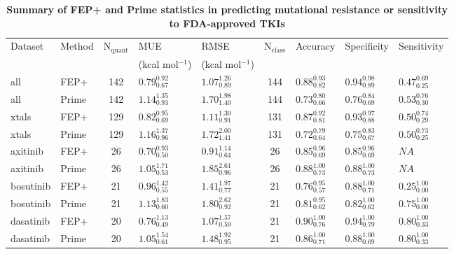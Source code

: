 \documentclass[phd,tocprelim]{cornell}
\begin{document}
\begin{landscape}
\begin{table}[p]
	\caption[Summary of FEP+ and Prime statistics in predicting mutational resistance or sensitivity to FDA-approved TKI]{
		\label{tab:abl-table-2} 
		{\bf Summary of FEP+ and Prime statistics in predicting mutational resistance or sensitivity to FDA-approved TKIs}
	}
	\setlength{\tabcolsep}{4pt}
	\begin{tabularx}{\linewidth}{X X | c X X | c X X X}
		\toprule
		Dataset		&Method		& N$_\mathrm{quant}$ &  MUE				   & RMSE					& N$_\mathrm{class}$ & Accuracy			& Specificity		& Sensitivity			\\
		&			&   &  (kcal mol$^{-1}$)		   & (kcal mol$^{-1}$)				& 	& 		 		& 					&		 			\\
		\midrule
		all & FEP+ & 142 & $0.79_{0.67}^{0.92}$ & $1.07_{0.89}^{1.26}$ & 144 & $0.88_{0.82}^{0.93}$ & $0.94_{0.89}^{0.98}$ & $0.47_{0.25}^{0.69}$ \\ 
		all & Prime & 142 & $1.14_{0.93}^{1.35}$ & $1.70_{1.40}^{1.98}$ & 144 & $0.73_{0.66}^{0.80}$ & $0.76_{0.69}^{0.84}$ & $0.53_{0.30}^{0.76}$ \\ 
		xtals & FEP+ & 129 & $0.82_{0.69}^{0.95}$ & $1.11_{0.91}^{1.30}$ & 131 & $0.87_{0.81}^{0.92}$ & $0.93_{0.88}^{0.97}$ & $0.50_{0.29}^{0.74}$ \\ 
		xtals & Prime & 129 & $1.16_{0.96}^{1.37}$ & $1.72_{1.41}^{2.00}$ & 131 & $0.72_{0.64}^{0.79}$ & $0.75_{0.67}^{0.83}$ & $0.50_{0.25}^{0.73}$ \\ 
		axitinib & FEP+ & 26 & $0.70_{0.50}^{0.93}$ & $0.91_{0.64}^{1.14}$ & 26 & $0.85_{0.69}^{0.96}$ & $0.85_{0.69}^{0.96}$ & $NA$ \\ 
		axitinib & Prime & 26 & $1.05_{0.53}^{1.71}$ & $1.85_{0.96}^{2.61}$ & 26 & $0.88_{0.73}^{1.00}$ & $0.88_{0.73}^{1.00}$ & $NA$ \\ 
		bosutinib & FEP+ & 21 & $0.96_{0.55}^{1.42}$ & $1.41_{0.77}^{1.97}$ & 21 & $0.76_{0.57}^{0.95}$ & $0.88_{0.71}^{1.00}$ & $0.25_{0.00}^{1.00}$ \\ 
		bosutinib & Prime & 21 & $1.13_{0.60}^{1.83}$ & $1.80_{0.92}^{2.62}$ & 21 & $0.81_{0.62}^{0.95}$ & $0.82_{0.62}^{1.00}$ & $0.75_{0.00}^{1.00}$ \\ 
		dasatinib & FEP+ & 20 & $0.76_{0.49}^{1.13}$ & $1.07_{0.59}^{1.57}$ & 21 & $0.90_{0.76}^{1.00}$ & $0.94_{0.79}^{1.00}$ & $0.80_{0.33}^{1.00}$ \\ 
		dasatinib & Prime & 20 & $1.05_{0.61}^{1.54}$ & $1.48_{0.95}^{1.92}$ & 21 & $0.86_{0.71}^{1.00}$ & $0.88_{0.69}^{1.00}$ & $0.80_{0.33}^{1.00}$ \\ 

\end{tabularx}
\end{table}
\end{landscape}
\end{document}
